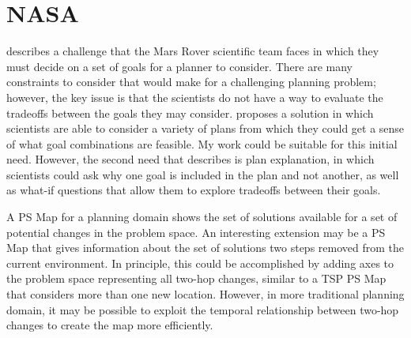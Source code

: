 \section{NASA}

\cite{DBLP:conf/aaai/Smith12} describes a challenge that the Mars Rover scientific team faces in which they must decide on a set of goals for a planner to consider.  There are many constraints to consider that would make for a challenging planning problem; however, the key issue is that the scientists do not have a way to evaluate the tradeoffs between the goals they may consider.  \citeauthor{DBLP:conf/aaai/Smith12} proposes a solution in which scientists are able to consider a variety of plans from which they could get a sense of what goal combinations are feasible.  My work could be suitable for this initial need.  However, the second need that \citeauthor{DBLP:conf/aaai/Smith12} describes is plan explanation, in which scientists could ask why one goal is included in the plan and not another, as well as what-if questions that allow them to explore tradeoffs between their goals.  

A PS Map for a planning domain shows the set of solutions available for a set of potential changes in the problem space.  An interesting extension may be a PS Map that gives information about the set of solutions two steps removed from the current environment.  In principle, this could be accomplished by adding axes to the problem space representing all two-hop changes, similar to a TSP PS Map that considers more  than one new location. However, in more traditional planning domain, it may be possible to exploit the temporal relationship between two-hop changes to create the map more efficiently.




